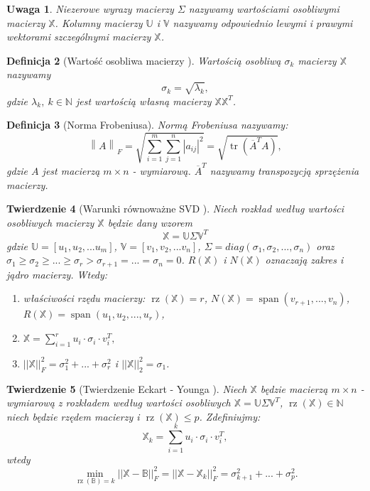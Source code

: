 \documentclass[12pt,a4paper]{report}
\newtheorem{df}{Definicja}[chapter]
\newtheorem{tw}[df]{Twierdzenie}
\newtheorem{uwaga}[df]{Uwaga}
\newcommand{\setN}{\mathbb{N}}
\newcommand{\przestrzen}[1]{\operatorname{span}\left({#1} \right)}
\newcommand{\norm}[2][]{\left\| {#2} \right\|_{#1}}
\newcommand{\rz}[1]{\operatorname{rz}\left({#1} \right)}
\newcommand{\tr}[1]{\operatorname{tr}\left({#1} \right)}
\begin{document}
\begin{uwaga}
Niezerowe wyrazy macierzy $\Sigma$ nazywamy wartościami osobliwymi macierzy $\mathbb{X}$.
Kolumny macierzy $\mathbb{U}$ i $\mathbb{V}$ nazywamy odpowiednio lewymi i prawymi wektorami szczególnymi macierzy $\mathbb{X}$.
\end{uwaga}

\begin{df}[Wartość osobliwa macierzy {\citep{wayls}}]
Wartością osobliwą $\sigma_k$ macierzy $\mathbb{X}$ nazywamy
$$
\sigma_k = \sqrt{\lambda_k},
$$
gdzie $\lambda_k, \: k \in \setN$ jest wartością własną macierzy $\mathbb{X} \mathbb{X}^T$.
\end{df}

\begin{df}[Norma Frobeniusa{\citep{ulafiir}}] %
Normą Frobeniusa nazywamy:
$$
{\norm{A}}_F = \sqrt{\sum_{i=1}^m \sum_{j=1}^n |a_{ij}|^2} = \sqrt{\tr{\overline{A}^T A}},
$$
gdzie $A$ jest macierzą $m\times n$ - wymiarową. $\overline{A}^T$ nazywamy transpozycją sprzężenia macierzy.
\end{df}

\begin{tw}[Warunki równoważne SVD {\citep{ulafiir}}]%
Niech rozkład według wartości osobliwych macierzy $\mathbb{X}$ będzie dany wzorem
$$
\mathbb{X}=\mathbb{U} \Sigma \mathbb{V}^T
$$
gdzie $\mathbb{U}=[u_1,u_2,...u_m]$, $\mathbb{V} = [v_1,v_2,...v_n]$, $\Sigma = diag(\sigma_1, \sigma_2,..., \sigma_n)$ oraz 
$\sigma_1\geq \sigma_2 \geq ... \geq \sigma_r > \sigma_{r+1} = ... = \sigma_n = 0$.
$R(\mathbb{X})$ i $N(\mathbb{X})$ oznaczają zakres i jądro macierzy.
Wtedy:
\begin{enumerate}
\item właściwości rzędu macierzy: $\rz{\mathbb{X}} = r$, $N(\mathbb{X}) = \przestrzen{v_{r+1},...,v_n}$, 
$R(\mathbb{X}) = \przestrzen{u_1,u_2,...,u_r}$,
\item $\mathbb{X} = \sum_{i=1}^r u_i \cdot\sigma_i \cdot v_i^T,$
\item $||\mathbb{X}||_F^2 = \sigma_1^2+...+\sigma_r^2$ i $||\mathbb{X}||_2^2 = \sigma_1$.
\end{enumerate}
\end{tw}

\begin{tw}[Twierdzenie Eckart - Younga {\citep{ulafiir}}]%
Niech $\mathbb{X}$ będzie macierzą $m \times n$ - wymiarową z rozkładem według wartości osobliwych $\mathbb{X}=\mathbb{U}\Sigma \mathbb{V}^T$, $\rz{\mathbb{X}} \in \setN$ niech będzie rzędem macierzy i $\rz{\mathbb{X}} \leq p$.
Zdefiniujmy:
$$
\mathbb{X}_k = \sum_{i=1}^k u_i\cdot \sigma_i \cdot v_i^T,
$$
wtedy
$$
\min \limits_{\rz{\mathbb{B}} = k } ||\mathbb{X} - \mathbb{B}||_F^2 = ||\mathbb{X} - \mathbb{X}_k||_F^2 = \sigma_{k+1}^2 + ... + \sigma_p^2.
$$
\end{tw}
\end{document}
